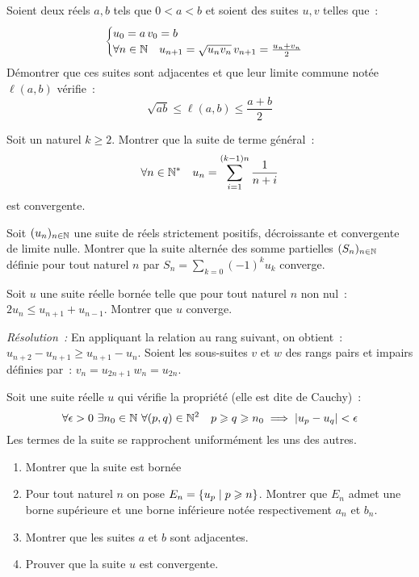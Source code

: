 \begin{exercice}
    Soient deux réels \(a, b\) tels que \(0 < a < b \) et soient des 
    suites \(u, v\) telles que~:
    \[ \begin{cases} u_0 = a \, v_0 = b \\ \forall n \in \mathbb{N} \quad 
        u_{n+1} = \sqrt{u_n v_n} \, v_{n+1} = \frac{u_n+v_n}{2} 
    \end{cases}\]
    Démontrer que ces suites sont adjacentes et que leur limite commune 
    notée \(\ell(a,b)\) vérifie~:
    \[ \sqrt{ab} \leqslant \ell(a,b) \leqslant \frac{a+b}{2}\]
\end{exercice}
\begin{exercice}
    Soit un naturel \(k \geqslant 2\). Montrer que la suite de terme 
    général~:
    \[ \forall n \in \mathbb{N}^* \quad u_n = \sum_{i = 1}^{(k-1)n} 
    \frac{1}{n+i} \]
    est convergente.
\end{exercice}
\begin{exercice}
    Soit \((u_n)_{n \in \mathbb{N}}\) une suite de réels strictement positifs, 
    décroissante et convergente de limite nulle. Montrer que la suite 
    alternée des somme partielles \((S_n)_{n\in\mathbb{N}}\) définie pour tout 
    naturel \(n\) par \(S_n = \sum_{k = 0} (-1)^k u_k\) converge.
\end{exercice}
\begin{exercice}
    Soit \(u\) une suite réelle bornée telle que pour tout naturel \(n\) 
    non nul~: \(2u_n \leqslant u_{n+1} + u_{n-1} \). Montrer que \(u\) 
    converge.
\end{exercice}
\emph{Résolution~:}
En appliquant la relation au rang suivant, on obtient~: \(u_{n+2} - 
u_{n+1} \geqslant u_{n+1} - u_n\). Soient les sous-suites \(v\) et 
\(w\) des rangs pairs et impairs définies par~: \(v_n = u_{2n+1} \ w_n 
= u_{2n}\).
\begin{exercice}
    Soit une suite réelle \(u\) qui vérifie la propriété (elle est dite 
    de Cauchy)~:
    \[ \forall \epsilon > 0 \ \exists n_0 \in \N \ \forall (p,q) \in 
    \N^2 \quad p \geqslant q \geqslant n_0 \implies \abs{u_p-u_q} < 
    \epsilon \]
    Les termes de la suite se rapprochent uniformément les uns des autres.
    \begin{enumerate}
        \item Montrer que la suite est bornée
        \item Pour tout naturel \(n\) on pose \(E_n = \left\{u_p\mathrel{}\middle|\mathrel{}p\geqslant 
            n\right\}\). Montrer que \(E_n\) admet une borne supérieure et une borne 
            inférieure notée respectivement \(a_n\) et \(b_n\).
        \item Montrer que les suites \(a\) et \(b\) sont adjacentes.
        \item Prouver que la suite \(u\) est convergente.
    \end{enumerate}
\end{exercice}
